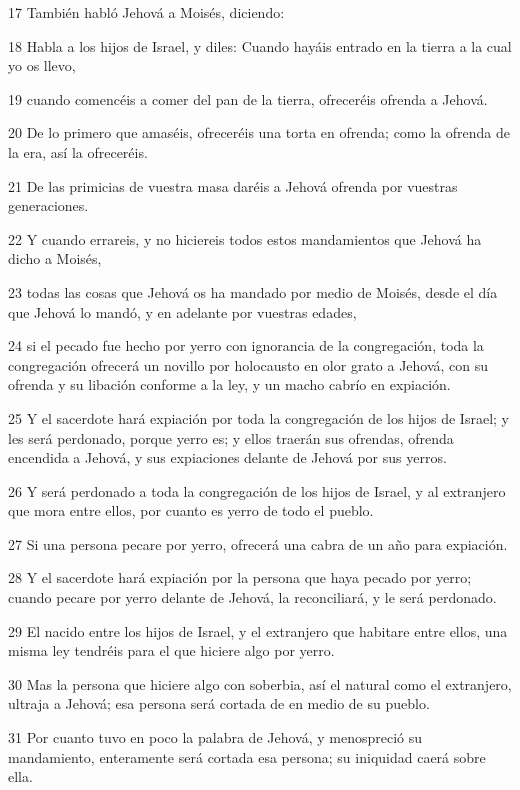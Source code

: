 \par 17 También habló Jehová a Moisés, diciendo:
\par 18 Habla a los hijos de Israel, y diles: Cuando hayáis entrado en la tierra a la cual yo os llevo,
\par 19 cuando comencéis a comer del pan de la tierra, ofreceréis ofrenda a Jehová.
\par 20 De lo primero que amaséis, ofreceréis una torta en ofrenda; como la ofrenda de la era, así la ofreceréis.
\par 21 De las primicias de vuestra masa daréis a Jehová ofrenda por vuestras generaciones.
\par 22 Y cuando errareis, y no hiciereis todos estos mandamientos que Jehová ha dicho a Moisés,
\par 23 todas las cosas que Jehová os ha mandado por medio de Moisés, desde el día que Jehová lo mandó, y en adelante por vuestras edades,
\par 24 si el pecado fue hecho por yerro con ignorancia de la congregación, toda la congregación ofrecerá un novillo por holocausto en olor grato a Jehová, con su ofrenda y su libación conforme a la ley, y un macho cabrío en expiación.
\par 25 Y el sacerdote hará expiación por toda la congregación de los hijos de Israel; y les será perdonado, porque yerro es; y ellos traerán sus ofrendas, ofrenda encendida a Jehová, y sus expiaciones delante de Jehová por sus yerros.
\par 26 Y será perdonado a toda la congregación de los hijos de Israel, y al extranjero que mora entre ellos, por cuanto es yerro de todo el pueblo.
\par 27 Si una persona pecare por yerro, ofrecerá una cabra de un año para expiación.
\par 28 Y el sacerdote hará expiación por la persona que haya pecado por yerro; cuando pecare por yerro delante de Jehová, la reconciliará, y le será perdonado.
\par 29 El nacido entre los hijos de Israel, y el extranjero que habitare entre ellos, una misma ley tendréis para el que hiciere algo por yerro.
\par 30 Mas la persona que hiciere algo con soberbia, así el natural como el extranjero, ultraja a Jehová; esa persona será cortada de en medio de su pueblo.
\par 31 Por cuanto tuvo en poco la palabra de Jehová, y menospreció su mandamiento, enteramente será cortada esa persona; su iniquidad caerá sobre ella.

